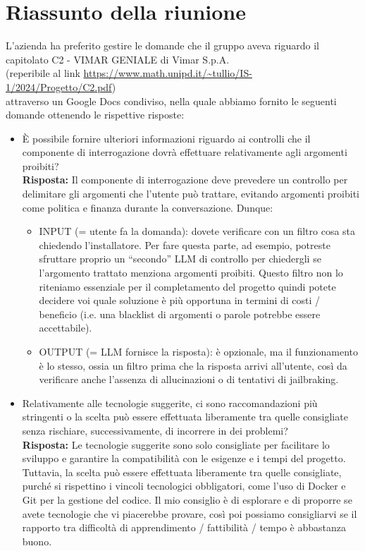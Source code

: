 \section{Riassunto della riunione}
L'azienda ha preferito gestire le domande che il gruppo aveva riguardo il capitolato C2 - VIMAR GENIALE di Vimar S.p.A. \\
(reperibile al link \url{https://www.math.unipd.it/~tullio/IS-1/2024/Progetto/C2.pdf}) \\ attraverso un Google Docs condiviso, nella quale abbiamo fornito le seguenti domande ottenendo le rispettive risposte:

\begin{itemize}
    \item È possibile fornire ulteriori informazioni riguardo ai controlli che il componente di interrogazione dovrà effettuare relativamente agli argomenti proibiti? \\
    \textbf{Risposta:} Il componente di interrogazione deve prevedere un controllo per delimitare gli argomenti che l’utente può trattare, evitando argomenti proibiti come politica e finanza durante la conversazione. Dunque: 
    \begin{itemize}
        \item INPUT (= utente fa la domanda): dovete verificare con un filtro cosa sta chiedendo l’installatore. Per fare questa parte, ad esempio, potreste sfruttare proprio un “secondo” LLM di controllo per chiedergli se l’argomento trattato menziona argomenti proibiti. Questo filtro non lo riteniamo essenziale per il completamento del progetto quindi potete decidere voi quale soluzione è più opportuna in termini di costi / beneficio (i.e. una blacklist di argomenti o parole potrebbe essere accettabile).
        \item OUTPUT (= LLM fornisce la risposta): è opzionale, ma il funzionamento è lo stesso, ossia un filtro prima che la risposta arrivi all’utente, così da verificare anche l’assenza di allucinazioni o di tentativi di jailbraking.
    \end{itemize}

    \item Relativamente alle tecnologie suggerite, ci sono raccomandazioni più stringenti o la scelta può essere effettuata liberamente tra quelle consigliate senza rischiare, successivamente, di incorrere in dei problemi? \\
    \textbf{Risposta:} Le tecnologie suggerite sono solo consigliate per facilitare lo sviluppo e garantire la compatibilità con le esigenze e i tempi del progetto. Tuttavia, la scelta può essere effettuata liberamente tra quelle consigliate, purché si rispettino i vincoli tecnologici obbligatori, come l’uso di Docker e Git per la gestione del codice. Il mio consiglio è di esplorare e di proporre se avete tecnologie che vi piacerebbe provare, così poi possiamo consigliarvi se il rapporto tra difficoltà di apprendimento / fattibilità / tempo è abbastanza buono.


\end{itemize}
